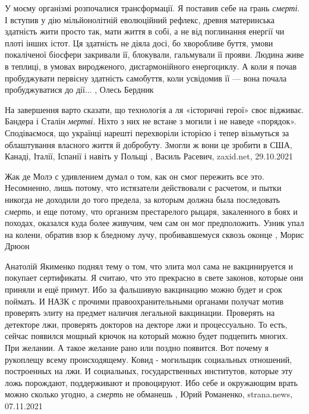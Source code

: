 У моєму організмі розпочалися трансформації. Я поставив себе на грань \emph{смерті}. І
вступив у дію мільйонолітній еволюційний рефлекс, древня материнська здатність
жити просто так, мати життя в собі, а не від поглинання енергії чи плоті інших
істот. Ця здатність не діяла досі, бо хворобливе буття, умови покаліченої
біосфери закривали її, блокували, гальмували її прояви. Людина живе в теплиці,
в умовах виродженого, дисгармонійного енергоциклу. А коли я почав пробуджувати
первісну здатність самобуття, коли усвідомив її — вона почала пробуджуватися до
дії...
, Олесь Бердник

На завершення варто сказати, що технологія а ля «історичні герої» своє
відживає. Бандера і Сталін \emph{мертві}. Ніхто з них не встане з могили і не наведе
«порядок». Сподіваємося, що українці нарешті перехворіли історією і тепер
візьмуться за облаштування власного життя й добробуту. Змогли ж вони це зробити
в США, Канаді, Італії, Іспанії і навіть у Польщі
, 
Василь Расевич, zaxid.net, 29.10.2021

Жак де Молэ с удивлением думал о том, как он  смог  пережить  все  это.
Несомненно, лишь потому, что истязатели действовали с  расчетом,  и  пытки
никогда не доходили до того предела, за которым  должна  была  последовать
\emph{смерть}, и еще потому, что организм престарелого рыцаря, закаленного в боях и
походах, оказался куда более живучим, чем сам он мог предположить.  Узник упал
на колени, обратив  взор  к  бледному  лучу,  пробивавшемуся сквозь оконце
, Морис Дрюон

Анатолій Якименко поднял тему о том, что элита мол сама не вакцинируется и
покупает сертификаты. Я считаю, что это прекрасно в свете законов, которые они
приняли и ещё примут.  Ибо за фальшивую вакцинацию можно будет и срок поймать.
И НАЗК с прочими правоохранительными органами получат мотив проверять элиту на
предмет наличия легальной вакцинации. Проверять на детекторе лжи, проверять
докторов на декторе лжи и процессуально.  То есть, сейчас появился мощный
крючок на который можно будет подцепить многих. При желании. А такое желание
рано или поздно появится.  Вот почему я рукоплещу всему происходящему. Ковид -
могильщик социальных отношений, построенных на лжи. И социальных,
государственных институтов, которые эту ложь порождают, поддерживают и
провоцируют. Ибо себе и окружающим врать можно сколько угодно, а \emph{смерть}
не обманешь
, 
Юрий Романенко, strana.news, 07.11.2021

